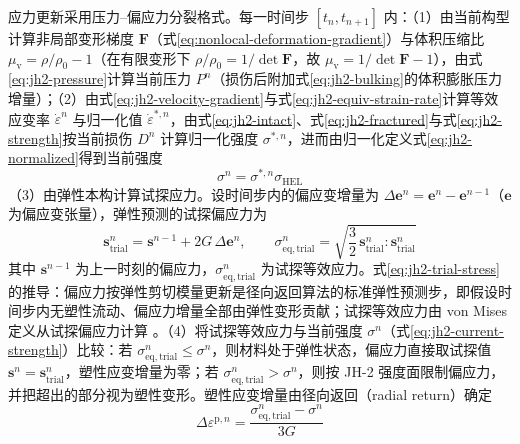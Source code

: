 应力更新采用压力--偏应力分裂格式。每一时间步 $[t_{n},t_{n+1}]$ 内：（1）由当前构型计算非局部变形梯度 $\mathbf{F}$（式\eqref{eq:nonlocal-deformation-gradient}）与体积压缩比 $\mu_{\mathrm{v}}=\rho/\rho_{0}-1$（在有限变形下 $\rho/\rho_{0}=1/\det\mathbf{F}$，故 $\mu_{\mathrm{v}}=1/\det\mathbf{F}-1$），由式\eqref{eq:jh2-pressure}计算当前压力 $P^{n}$（损伤后附加式\eqref{eq:jh2-bulking}的体积膨胀压力增量）；（2）由式\eqref{eq:jh2-velocity-gradient}与式\eqref{eq:jh2-equiv-strain-rate}计算等效应变率 $\dot{\varepsilon}^{n}$ 与归一化值 $\dot{\varepsilon}^{*,n}$，由式\eqref{eq:jh2-intact}、式\eqref{eq:jh2-fractured}与式\eqref{eq:jh2-strength}按当前损伤 $D^{n}$ 计算归一化强度 $\sigma^{*,n}$，进而由归一化定义式\eqref{eq:jh2-normalized}得到当前强度
\begin{equation}
  \sigma^{n}=\sigma^{*,n}\sigma_{\mathrm{HEL}}
  \label{eq:jh2-current-strength}
\end{equation}
（3）由弹性本构计算试探应力。设时间步内的偏应变增量为 $\Delta\mathbf{e}^{n}=\mathbf{e}^{n}-\mathbf{e}^{n-1}$（$\mathbf{e}$ 为偏应变张量），弹性预测的试探偏应力为
\begin{equation}
  \mathbf{s}^{n}_{\mathrm{trial}}
  =\mathbf{s}^{n-1}+2G\,\Delta\mathbf{e}^{n},
  \qquad
  \sigma^{n}_{\mathrm{eq,trial}}
  =\sqrt{\frac{3}{2}\,\mathbf{s}^{n}_{\mathrm{trial}}:\mathbf{s}^{n}_{\mathrm{trial}}}
  \label{eq:jh2-trial-stress}
\end{equation}
其中 $\mathbf{s}^{n-1}$ 为上一时刻的偏应力，$\sigma^{n}_{\mathrm{eq,trial}}$ 为试探等效应力。式\eqref{eq:jh2-trial-stress}的推导：偏应力按弹性剪切模量更新是径向返回算法的标准弹性预测步，即假设时间步内无塑性流动、偏应力增量全部由弹性变形贡献；试探等效应力由 von Mises 定义从试探偏应力计算 \cite{SimoHughes1998,Lai2018}。（4）将试探等效应力与当前强度 $\sigma^{n}$（式\eqref{eq:jh2-current-strength}）比较：若 $\sigma^{n}_{\mathrm{eq,trial}}\le\sigma^{n}$，则材料处于弹性状态，偏应力直接取试探值 $\mathbf{s}^{n}=\mathbf{s}^{n}_{\mathrm{trial}}$，塑性应变增量为零；若 $\sigma^{n}_{\mathrm{eq,trial}}>\sigma^{n}$，则按 JH-2 强度面限制偏应力，并把超出的部分视为塑性变形。塑性应变增量由径向返回（radial return）确定
\begin{equation}
  \Delta\varepsilon^{\mathrm{p},n}
  =\frac{\sigma^{n}_{\mathrm{eq,trial}}-\sigma^{n}}{3G}
  \label{eq:jh2-plastic-increment}
\end{equation}

